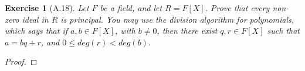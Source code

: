 \documentclass[12pt]{article}
\newtheorem{exercise}{Exercise}
\begin{document}
\begin{exercise}[A.18]
Let $F$ be a field, and let $R = F[X]$. Prove that every non-zero ideal in $R$ is principal. You may use the division algorithm for polynomials, which says that if $a, b \in F[X]$, with $b \neq  0$, then there exist $q, r \in F[X]$ such that $a = bq+r$, and $0 \leq deg(r) < deg(b)$.
\end{exercise}

\begin{proof}

\end{proof}
\end{document}
